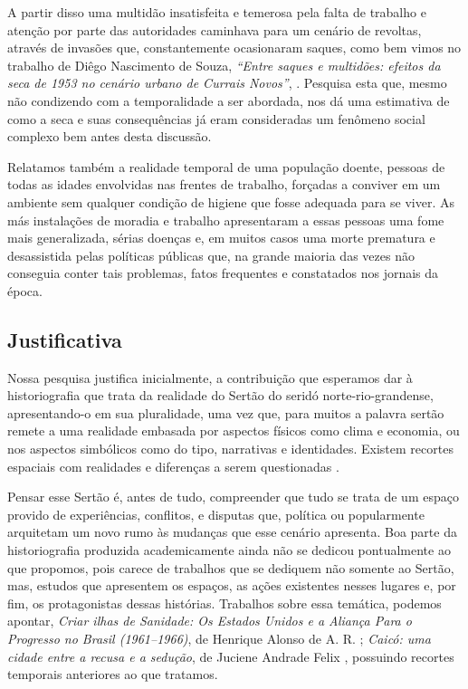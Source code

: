 \begin{refsection}
    A partir disso uma multidão insatisfeita e temerosa pela falta de trabalho e atenção por parte das autoridades caminhava para um cenário de revoltas, através de invasões que, constantemente ocasionaram saques, como bem vimos no trabalho de Diêgo Nascimento de Souza, \textit{``Entre saques e multidões: efeitos da seca de 1953 no cenário urbano de Currais Novos''}, \citeyear{Souza2012Entre}. Pesquisa esta que, mesmo não condizendo com a temporalidade a ser abordada, nos dá uma estimativa de como a seca e suas consequências já eram consideradas um fenômeno social complexo bem antes desta discussão. 

    Relatamos também a realidade temporal de uma população doente, pessoas de todas as idades envolvidas nas frentes de trabalho, forçadas a conviver em um ambiente sem qualquer condição de higiene que fosse adequada para se viver. As más instalações de moradia e trabalho apresentaram a essas pessoas uma fome mais generalizada, sérias doenças e, em muitos casos uma morte prematura e desassistida pelas políticas públicas que, na grande maioria das vezes não conseguia conter tais problemas, fatos frequentes e constatados nos jornais da época. 

    \subsection{Justificativa}

    Nossa pesquisa justifica inicialmente, a contribuição que esperamos dar à historiografia que trata da realidade do Sertão do seridó norte-rio-grandense, apre\-sen\-tando-o em sua pluralidade, uma vez que, para muitos a palavra sertão remete a uma realidade embasada por aspectos físicos como clima e economia, ou nos aspectos simbólicos como do tipo, narrativas e identidades. Existem recortes espaciais com realidades e diferenças a serem questionadas \cite[p.~41--42]{AlbuquerqueJr2014Distante}.

    Pensar esse Sertão é, antes de tudo, compreender que tudo se trata de um espaço provido de experiências, conflitos, e disputas que, política ou popularmente arquitetam um novo rumo às mudanças que esse cenário apresenta. Boa parte da historiografia produzida academicamente ainda não se dedicou pontualmente ao que propomos, pois carece de trabalhos que se dediquem não somente ao Sertão, mas, estudos que apresentem os espaços, as ações existentes nesses lugares e, por fim, os protagonistas dessas histórias. Trabalhos sobre essa temática, podemos apontar, \textit{Criar ilhas de Sanidade: Os Estados Unidos e a Aliança Para o Progresso no Brasil (1961--1966)}, de Henrique Alonso de A. R. \textcite{Pereira2005Criar}; \textit{Caicó: uma cidade entre a recusa e a sedução}, de Juciene Andrade Felix \textcite{Andrade2007Caico}, possuindo recortes temporais anteriores ao que tratamos.


\end{refsection}
